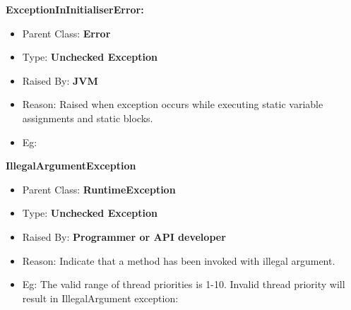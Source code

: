 \begin{flushleft}
	\textbf{ExceptionInInitialiserError:}
	\begin{itemize} 
		\item Parent Class: \textbf{Error}
		\item Type: \textbf{Unchecked Exception}
		\item Raised By: \textbf{JVM}
		\item Reason: Raised when exception occurs while executing static variable assignments and static blocks.		
		\item Eg:
		\bigskip
	\end{itemize}
	
	\textbf{IllegalArgumentException}
	\begin{itemize}
		\item Parent Class: \textbf{RuntimeException}
		\item Type: \textbf{Unchecked Exception}
		\item Raised By: \textbf{Programmer or API developer}
		\item Reason: Indicate that a method has been invoked with illegal argument.
		\item Eg: The valid range of thread priorities is 1-10. Invalid thread priority will result in IllegalArgument exception:
		\bigskip
		\bigskip
	\end{itemize}
	

\end{flushleft}
